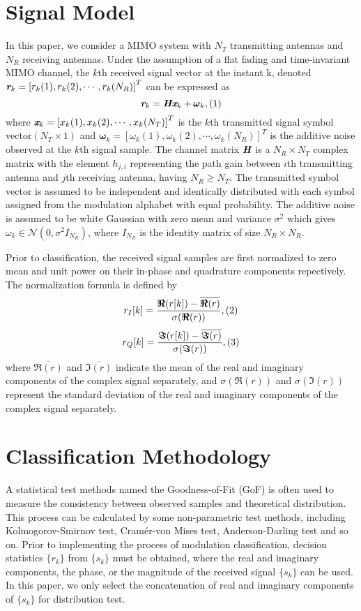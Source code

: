 \documentclass[conference]{IEEEtran}
\begin{document}
\section{Signal Model}
In this paper, we consider a MIMO system with $N_{T}$ transmitting antennas and $N_{R}$ receiving antennas. Under the assumption of a flat fading and time-invariant MIMO channel, the $k$th received signal vector at the instant k, denoted $\emph{\textbf{r}}_k=\left[r_k(1),r_k(2),\cdots,r_k(N_R)\right]^T$ can be expressed as $$\emph{\textbf{r}}_k=\emph{\textbf{H}}\emph{\textbf{x}}_k+\pmb{\omega}_k,\relax{(1)}$$
where $\emph{\textbf{x}}_k=\left[x_k(1),x_k(2),\cdots,x_k(N_{T})\right]^T$ is the $k$th transmitted signal symbol vector$(N_{T}\times{1})$ and $\pmb{\omega}_k=\left[\omega_k(1),\omega_k(2),\cdots,\omega_k(N_R)\right]^T$ is the additive noise observed at the $k$th signal sample. The channel matrix $\emph{\textbf{H}}$ is a $N_{R}\times{N_{T}}$ complex matrix with the element $h_{j,i}$ representing the path gain between $i$th transmitting antenna and $j$th receiving antenna, having $N_{R}\geq{N_{T}}$. The transmitted symbol vector is assumed to be independent and identically distributed with each symbol assigned from the modulation alphabet with equal probability. The additive noise is assumed to be white Gaussian with zero mean and variance $\sigma^2$ which gives $\omega_k\in\mathcal{N}(0,\sigma^2I_{N_{R}})$, where $I_{N_{R}}$ is the identity matrix of size $N_{R}\times{N_{R}}$.\par
Prior to classification, the received signal samples are first normalized to zero mean and unit power on their in-phase and quadrature components repectively. The normalization formula is defined by
$$r_{I}[k]=\frac{\bm{\Re}(r[k])-\overline{\bm{\Re}(r)}}{\sigma(\bm{\Re}(r))},\relax{(2)}$$
$$r_{Q}[k]=\frac{\bm{\Im}(r[k])-\overline{\bm{\Im}(r)}}{\sigma(\bm{\Im}(r))},\relax{(3)}$$
where $\overline{\bm{\Re}(r)}$ and $\overline{\bm{\Im}(r)}$ indicate the mean of the real and imaginary components of the complex signal separately, and
$\sigma(\bm{\Re}(r))$ and $\sigma(\bm{\Im}(r))$ represent the standard deviation of the real and imaginary components of the complex signal separately.

\section{Classification Methodology}
A statistical test methods named the Goodness-of-Fit (GoF) is often used to measure the consistency between observed samples and theoretical distribution. This process can be calculated by some non-parametric test methods, including Kolmogorov-Smirnov test, Cramér-von Mises test, Anderson-Darling test and so on. Prior to implementing the process of modulation classification, decision statistics $\{r_k\}$ from $\{s_k\}$ must be obtained, where the real and imaginary components, the phase, or the magnitude of the received signal $\{s_k\}$ can be used. In this paper, we only select the concatenation of real and imaginary components of $\{s_k\}$ for distribution test.
\end{document}
